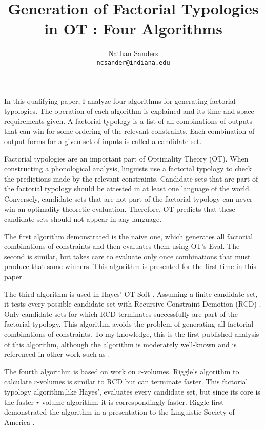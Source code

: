\documentclass[11pt]{article}
\author{Nathan Sanders \\ \tt{ncsander@indiana.edu}}
\title{Generation of Factorial Typologies in OT : Four Algorithms}
\begin{document}
\maketitle

In this qualifying paper, I analyze four algorithms for generating
factorial typologies. The operation of each algorithm is explained and
its time and space requirements given. %
A factorial typology is a list of all combinations of outputs that can
win for some ordering of the relevant constraints. Each combination of
output forms for a given set of inputs is called a candidate set.

Factorial typologies are an important part of Optimality Theory
(OT). When constructing a phonological analysis, linguists use a
factorial typology to check the predictions made by the
relevant constraints. Candidate sets that are part of the factorial
typology should be attested in at least one language of the world.
Conversely, candidate sets that are not part of the factorial typology
can never win an optimality theoretic evaluation. Therefore, OT predicts that
these candidate sets should not appear in any
language.

The first algorithm demonstrated is the naive one,
which generates all factorial combinations of constraints and then evaluates
them using OT's {\sc Eval}.  The second is similar, but
takes care to evaluate only once combinations that must produce that same
winners. This algorithm is presented for the first time in this
paper.

The third algorithm is used in Hayes' OT-Soft \cite{hayes03}. Assuming
a finite candidate set, it tests every possible candidate set with
Recursive Constraint Demotion (RCD) \cite{tesar93}. Only candidate
sets for which RCD terminates successfully are part of the factorial
typology. This algorithm avoids the problem of generating all
factorial combinations of constraints. To my knowledge, this is the
first published analysis of this algorithm, although the algorithm is
moderately well-known and is referenced in other work such as
.

The fourth algorithm is based on  work on
$r$-volumes. Riggle's algorithm to calculate $r$-volumes is similar to
RCD but can terminate faster. This factorial typology algorithm,like
Hayes', evaluates every candidate set, but since its core is the faster
$r$-volume algorithm, it is correspondingly faster. Riggle first
demonstrated the algorithm in a presentation to the Linguistic Society
of America \cite{riggle07}.



\end{document}
